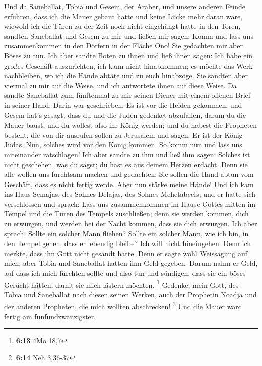  Und da Saneballat, Tobia und Gesem, der Araber, und unsere
anderen Feinde erfuhren, dass ich die Mauer gebaut hatte und keine Lücke
mehr daran wäre, wiewohl ich die Türen zu der Zeit noch nicht eingehängt
hatte in den Toren,  sandten Saneballat und Gesem zu mir und
ließen mir sagen: Komm und lass uns zusammenkommen in den Dörfern in der
Fläche Ono! Sie gedachten mir aber Böses zu tun.  Ich aber
sandte Boten zu ihnen und ließ ihnen sagen: Ich habe ein großes Geschäft
auszurichten, ich kann nicht hinabkommen; es möchte das Werk
nachbleiben, wo ich die Hände abtäte und zu euch hinabzöge. 
Sie sandten aber viermal zu mir auf die Weise, und ich antwortete ihnen
auf diese Weise.  Da sandte Saneballat zum fünftenmal zu mir
seinen Diener mit einem offenen Brief in seiner Hand.  Darin
war geschrieben: Es ist vor die Heiden gekommen, und Gesem hat's gesagt,
dass du und die Juden gedenket abzufallen, darum du die Mauer baust, und
du wollest also ihr König werden;  und du habest die
Propheten bestellt, die von dir ausrufen sollen zu Jerusalem und sagen:
Er ist der König Judas. Nun, solches wird vor den König kommen. So komm
nun und lass uns miteinander ratschlagen!  Ich aber sandte
zu ihm und ließ ihm sagen: Solches ist nicht geschehen, was du sagst; du
hast es aus deinem Herzen erdacht.  Denn sie alle wollen uns
furchtsam machen und gedachten: Sie sollen die Hand abtun vom Geschäft,
dass es nicht fertig werde. Aber nun stärke meine Hände! 
Und ich kam ins Haus Semajas, des Sohnes Delajas, des Sohnes
Mehetabeels; und er hatte sich verschlossen und sprach: Lass uns
zusammenkommen im Hause Gottes mitten im Tempel und die Türen des
Tempels zuschließen; denn sie werden kommen, dich zu erwürgen, und
werden bei der Nacht kommen, dass sie dich erwürgen.  Ich
aber sprach: Sollte ein solcher Mann fliehen? Sollte ein solcher Mann,
wie ich bin, in den Tempel gehen, dass er lebendig bleibe? Ich will
nicht hineingehen.  Denn ich merkte, dass ihn Gott nicht
gesandt hatte. Denn er sagte wohl Weissagung auf mich; aber Tobia und
Saneballat hatten ihm Geld gegeben.  Darum nahm er Geld,
auf dass ich mich fürchten sollte und also tun und sündigen, dass sie
ein böses Gerücht hätten, damit sie mich lästern möchten. \footnote{\textbf{6:13}
  4Mo 18,7}  Gedenke, mein Gott, des Tobia und Saneballat
nach diesen seinen Werken, auch der Prophetin Noadja und der anderen
Propheten, die mich wollten abschrecken! \footnote{\textbf{6:14} Neh
  3,36-37}  Und die Mauer ward fertig am fünfundzwanzigsten
